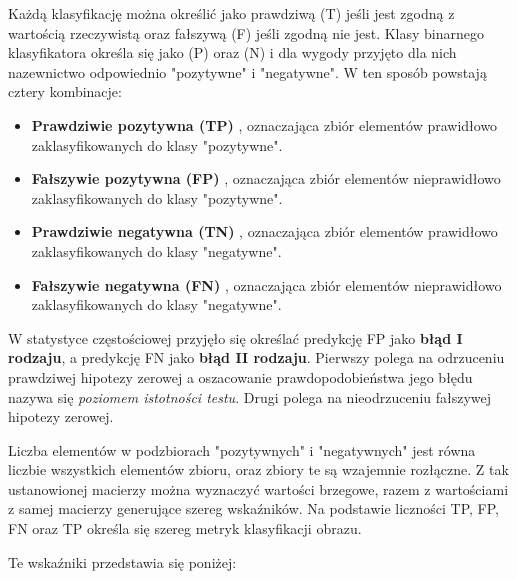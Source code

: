 Każdą klasyfikację można określić jako prawdziwą (T) jeśli jest zgodną z wartością rzeczywistą oraz fałszywą (F) jeśli zgodną nie jest. Klasy binarnego klasyfikatora określa się jako (P) oraz (N) i dla wygody przyjęto dla nich nazewnictwo odpowiednio "pozytywne" i "negatywne". W ten sposób powstają cztery kombinacje: 
\begin{itemize}
    \item \textbf{Prawdziwie pozytywna (TP)} , oznaczająca zbiór elementów prawidłowo zaklasyfikowanych do klasy "pozytywne".
    \item \textbf{Fałszywie pozytywna (FP)} , oznaczająca zbiór elementów nieprawidłowo zaklasyfikowanych do klasy "pozytywne".
    \item \textbf{Prawdziwie negatywna (TN)} , oznaczająca zbiór elementów prawidłowo zaklasyfikowanych do klasy "negatywne".
    \item \textbf{Fałszywie negatywna (FN)} , oznaczająca zbiór elementów nieprawidłowo zaklasyfikowanych do klasy "negatywne".
\end{itemize} 

\par W statystyce częstościowej przyjęło się określać predykcję FP jako \textbf{błąd I rodzaju}, a predykcję FN jako \textbf{błąd II rodzaju}. Pierwszy polega na odrzuceniu prawdziwej hipotezy zerowej a oszacowanie prawdopodobieństwa jego błędu nazywa się \textit{poziomem istotności testu}. Drugi polega na nieodrzuceniu fałszywej hipotezy zerowej.

Liczba elementów w podzbiorach "pozytywnych" i "negatywnych" jest równa liczbie wszystkich elementów zbioru, oraz zbiory te są wzajemnie rozłączne. Z tak ustanowionej macierzy można wyznaczyć wartości brzegowe, razem z wartościami z samej macierzy generujące szereg wskaźników. Na podstawie liczności TP, FP, FN oraz TP określa się szereg metryk klasyfikacji obrazu.

Te wskaźniki przedstawia się poniżej:

